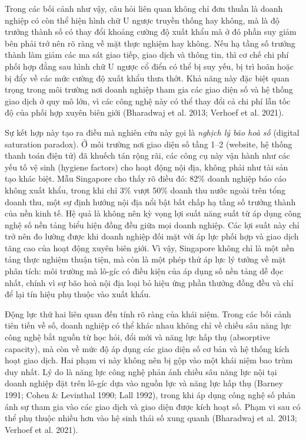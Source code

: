\documentclass[12pt,a4paper]{article}
\begin{document}
Trong các bối cảnh như vậy, câu hỏi liên quan không chỉ đơn thuần là
doanh nghiệp có còn thể hiện hình chữ U ngược truyền thống hay không, mà
là độ trưởng thành số có thay đổi khoảng cường độ xuất khẩu mà ở đó phần
suy giảm bên phải trở nên rõ ràng về mặt thực nghiệm hay không. Nếu hạ
tầng số trưởng thành làm giảm các ma sát giao tiếp, giao dịch và thông
tin, thì cơ chế chi phí phối hợp đằng sau hình chữ U ngược cổ điển có
thể bị suy yếu, bị trì hoãn hoặc bị đẩy về các mức cường độ xuất khẩu
thưa thớt. Khả năng này đặc biệt quan trọng trong môi trường nơi doanh
nghiệp tham gia các giao diện số và hệ thống giao dịch ở quy mô lớn, vì
các công nghệ này có thể thay đổi cả chi phí lẫn tốc độ của phối hợp
xuyên biên giới (Bharadwaj et al. 2013; Verhoef et al. 2021).

Sự kết hợp này tạo ra điều mà nghiên cứu này gọi là \emph{nghịch lý bão
hoà số} (digital saturation paradox). Ở môi trường nơi giao diện số tầng
1--2 (website, hệ thống thanh toán điện tử) đã khuếch tán rộng rãi, các
công cụ này vận hành như các yếu tố vệ sinh (hygiene factors) cho hoạt
động nội địa, không phải như tài sản tạo khác biệt. Mẫu Singapore cho
thấy rõ điều đó: 82\% doanh nghiệp báo cáo không xuất khẩu, trong khi
chỉ 3\% vượt 50\% doanh thu nước ngoài trên tổng doanh thu, một sự định
hướng nội địa nổi bật bất chấp hạ tầng số trưởng thành của nền kinh tế.
Hệ quả là không nên kỳ vọng lợi suất năng suất từ áp dụng công nghệ số
nền tảng biểu hiện đồng đều giữa mọi doanh nghiệp. Các lợi suất này chỉ
trở nên đo lường được khi doanh nghiệp đối mặt với áp lực phối hợp và
giao dịch tăng cao của hoạt động xuyên biên giới. Vì vậy, Singapore
không chỉ là một nền tảng thực nghiệm thuận tiện, mà còn là một phép thử
áp lực lý tưởng về mặt phân tích: môi trường mà lô-gíc có điều kiện của
áp dụng số nền tảng dễ đọc nhất, chính vì sự bão hoà nội địa loại bỏ
hiệu ứng phần thưởng đồng đều và chỉ để lại tín hiệu phụ thuộc vào xuất
khẩu.

Động lực thứ hai liên quan đến tính rõ ràng của khái niệm. Trong các bối
cảnh tiên tiến về số, doanh nghiệp có thể khác nhau không chỉ về chiều
sâu năng lực công nghệ bắt nguồn từ học hỏi, đổi mới và năng lực hấp thụ
(absorptive capacity), mà còn về mức độ áp dụng các giao diện số cơ bản
và hệ thống kích hoạt giao dịch. Hai phạm vi này không nên bị gộp vào
một khái niệm bao trùm duy nhất. Lý do là năng lực công nghệ phản ánh
chiều sâu năng lực nội tại doanh nghiệp đặt trên lô-gíc dựa vào nguồn
lực và năng lực hấp thụ (Barney 1991; Cohen \& Levinthal 1990; Lall
1992), trong khi áp dụng công nghệ số phản ánh sự tham gia vào các giao
dịch và giao diện được kích hoạt số. Phạm vi sau có thể phụ thuộc nhiều
hơn vào hệ sinh thái số xung quanh (Bharadwaj et al. 2013; Verhoef et
al. 2021).
\end{document}
